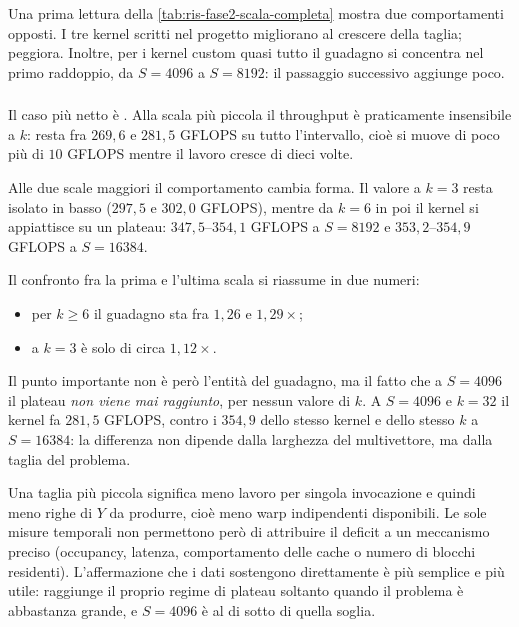 Una prima lettura della \cref{tab:ris-fase2-scala-completa} mostra due
comportamenti opposti. I tre kernel scritti nel progetto migliorano al
crescere della taglia;  peggiora. Inoltre, per i kernel
custom quasi tutto il guadagno si concentra nel primo raddoppio, da $S=4096$ a
$S=8192$: il passaggio successivo aggiunge poco.

\subsubsection{}

Il caso più netto è . Alla scala più piccola il
throughput è praticamente insensibile a $k$: resta fra $269{,}6$ e
$281{,}5$ GFLOPS su tutto l'intervallo, cioè si muove di poco più di
$10$ GFLOPS mentre il lavoro cresce di dieci volte.

Alle due scale maggiori il comportamento cambia forma. Il valore a $k=3$ resta
isolato in basso ($297{,}5$ e $302{,}0$ GFLOPS), mentre da $k=6$ in poi il
kernel si appiattisce su un plateau: $347{,}5$–$354{,}1$ GFLOPS a $S=8192$ e
$353{,}2$–$354{,}9$ GFLOPS a $S=\num{16384}$.

Il confronto fra la prima e l'ultima scala si riassume in due numeri:

\begin{itemize}
  \item per $k\ge6$ il guadagno sta fra $1{,}26$ e $1{,}29\times$;
  \item a $k=3$ è solo di circa $1{,}12\times$.
\end{itemize}

Il punto importante non è però l'entità del guadagno, ma il fatto che a
$S=4096$ il plateau \emph{non viene mai raggiunto}, per nessun valore di $k$.
A $S=4096$ e $k=32$ il kernel fa $281{,}5$ GFLOPS, contro i $354{,}9$ dello
stesso kernel e dello stesso $k$ a $S=\num{16384}$: la differenza non dipende
dalla larghezza del multivettore, ma dalla taglia del problema.

Una taglia più piccola significa meno lavoro per singola invocazione e quindi
meno righe di $Y$ da produrre, cioè meno warp indipendenti disponibili. Le sole
misure temporali non permettono però di attribuire il deficit a un meccanismo
preciso (occupancy, latenza, comportamento delle cache o numero di blocchi
residenti). L'affermazione che i dati sostengono direttamente è più semplice e
più utile:  raggiunge il proprio regime di plateau
soltanto quando il problema è abbastanza grande, e $S=4096$ è al di sotto di
quella soglia.

